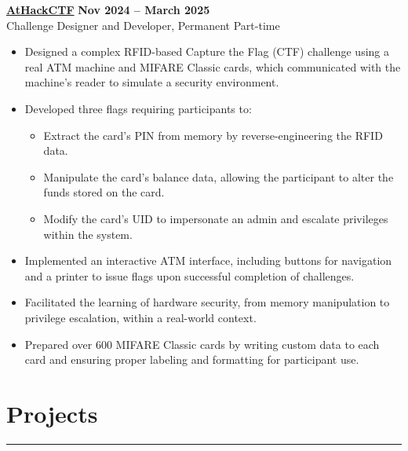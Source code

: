 \documentclass[10pt]{article}
\begin{document}
{\href{https://www.athackctf.com}{\textbf{AtHackCTF}}} \hfill \textbf{Nov 2024 -- March 2025} \\
{Challenge Designer and Developer, Permanent Part-time}
\vspace{-3mm}

\begin{itemize}[left=0.15in, itemsep=0pt]
    \item Designed a complex RFID-based Capture the Flag (CTF) challenge using a real ATM machine and MIFARE Classic cards, which communicated with the machine's reader to simulate a security environment.
    \item Developed three flags requiring participants to:
    
        \begin{itemize}[left=0.2in, itemsep=0pt]
            \vspace{-2mm}
            \item Extract the card’s PIN from memory by reverse-engineering the RFID data.
            \item Manipulate the card's balance data, allowing the participant to alter the funds stored on the card.
            \item Modify the card's UID to impersonate an admin and escalate privileges within the system.
        \end{itemize}
        \vspace{-2mm}
    
    \item Implemented an interactive ATM interface, including buttons for navigation and a printer to issue flags upon successful completion of challenges.
    \item Facilitated the learning of hardware security, from memory manipulation to privilege escalation, within a real-world context.
    \item Prepared over 600 MIFARE Classic cards by writing custom data to each card and ensuring proper labeling and formatting for participant use.

\end{itemize}

\vspace{-6mm} %
\section*{Projects}
\vspace{-2mm}
\hrule
\vspace{0mm}
\end{document}
